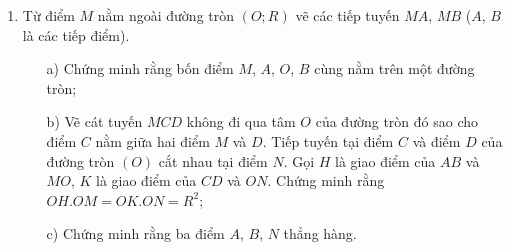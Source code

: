 \begin{ex}%
\hfill
\begin{enumerate}
\item Từ điểm $M$ nằm ngoài đường tròn $(O;R)$ vẽ các tiếp tuyến $MA$, $MB$ ($A$, $B$ là các tiếp điểm).
\begin{enumerate}
\item[a)] Chứng minh rằng bốn điểm $M$, $A$, $O$, $B$ cùng nằm trên một đường tròn;
\item[b)] Vẽ cát tuyến $MCD$ không đi qua tâm $O$ của đường tròn đó sao cho điểm $C$ nằm giữa hai điểm $M$ và $D$. Tiếp tuyến tại điểm $C$ và điểm $D$ của đường tròn $(O)$ cắt nhau tại điểm $N$. Gọi $H$ là giao điểm của $AB$ và $MO$, $K$ là giao điểm của $CD$ và $ON$. Chứng minh rằng $OH.OM=OK.ON=R^2$;
\item[c)] Chứng minh rằng ba điểm $A$, $B$, $N$ thẳng hàng.
\end{enumerate}
    

\end{enumerate}
\end{ex}
